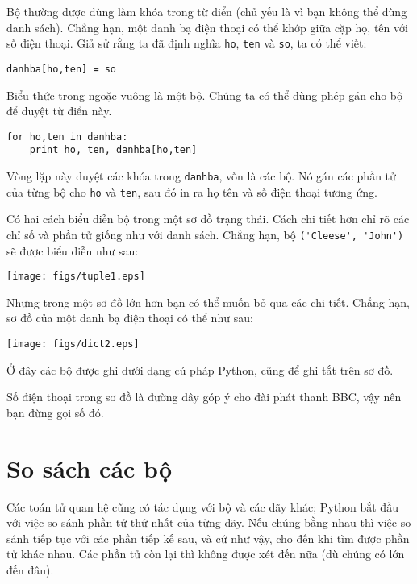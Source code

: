 \documentclass[11pt]{book}
\begin{document}
Bộ thường được dùng làm khóa trong từ điển (chủ yếu là vì bạn
không thể dùng danh sách). Chẳng hạn, một danh bạ điện thoại có thể
khớp giữa cặp họ, tên với số điện thoại. Giả sử rằng ta đã 
định nghĩa {\tt ho}, {\tt ten} và {\tt so}, ta có thể viết:

\beforeverb
\begin{verbatim}
danhba[ho,ten] = so
\end{verbatim}
\afterverb
%
Biểu thức trong ngoặc vuông là một bộ. Chúng ta có thể dùng 
phép gán cho bộ để duyệt từ điển này.


\beforeverb
\begin{verbatim}
for ho,ten in danhba:
    print ho, ten, danhba[ho,ten]
\end{verbatim}
\afterverb
%
Vòng lặp này duyệt các khóa trong {\tt danhba}, vốn là các bộ. Nó gán
các phần tử của từng bộ cho {\tt ho} và {\tt ten}, sau đó in ra
họ tên và số điện thoại tương ứng.

Có hai cách biểu diễn bộ trong một sơ đồ trạng thái. Cách chi tiết hơn
chỉ rõ các chỉ số và phần tử giống như với danh sách. Chẳng hạn,
bộ \verb"('Cleese', 'John')" sẽ được biểu diễn như sau:


\beforefig
\centerline{\texttt{[image: figs/tuple1.eps]}}
\afterfig

Nhưng trong một sơ đồ lớn hơn bạn có thể muốn bỏ qua các chi tiết.
Chẳng hạn, sơ đồ của một danh bạ điện thoại có thể như sau:

\beforefig
\centerline{\texttt{[image: figs/dict2.eps]}}
\afterfig

Ở đây các bộ được ghi dưới dạng cú pháp Python, cũng để ghi tắt
trên sơ đồ.

Số điện thoại trong sơ đồ là đường dây góp ý cho đài phát thanh BBC,
vậy nên bạn đừng gọi số đó.



\section{So sách các bộ}


Các toán tử quan hệ cũng có tác dụng với bộ và các dãy khác;
Python bắt đầu với việc so sánh phần tử thứ nhất của từng dãy.
Nếu chúng bằng nhau thì việc so sánh tiếp tục với các phần tiếp
kế sau, và cứ như vậy, cho đến khi tìm được phần tử khác nhau.
Các phần tử còn lại thì không được xét đến nữa (dù chúng có
lớn đến đâu).
\end{document}
